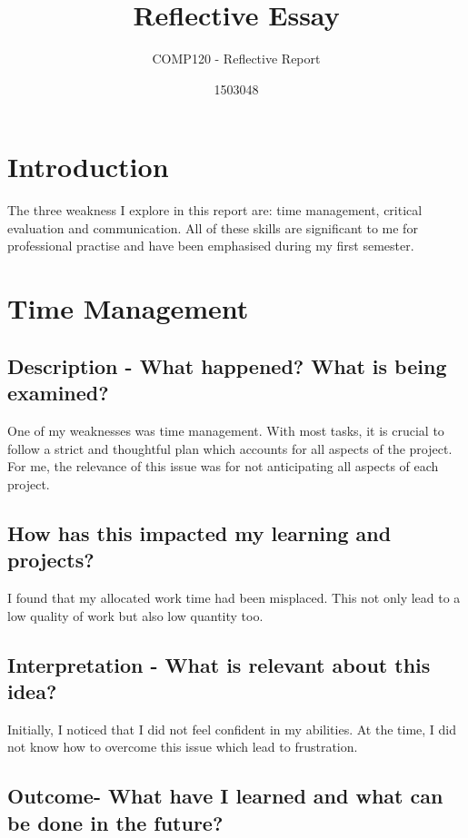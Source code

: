 \documentclass{scrartcl}
\title{Reflective Essay}
\subtitle{COMP120 - Reflective Report}
\author{1503048}
\begin{document}
\maketitle


\section{Introduction}

The three weakness I explore in this report are: time management, critical evaluation and communication. All of these skills are significant to me for professional practise and have been emphasised during my first semester.

\section{Time Management}

\subsection{Description - What happened? What is being examined?}

One of my weaknesses was time management. With most tasks, it is crucial to follow a strict and thoughtful plan which accounts for all aspects of the project. For me, the relevance of this issue was for not anticipating all aspects of each project.

\subsection{How has this impacted my learning and projects?}

I found that my allocated work time had been misplaced. This not only lead to a low quality of work but also low quantity too.

\subsection{Interpretation - What is relevant about this idea?}

Initially, I noticed that I did not feel confident in my abilities. At the time, I did not know how to overcome this issue which lead to frustration.

\subsection{Outcome- What have I learned and what can be done in the future?}
\end{document}
